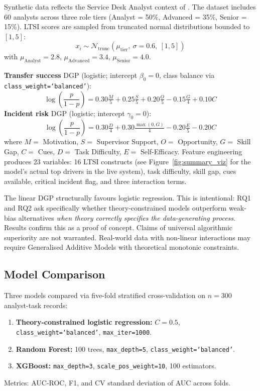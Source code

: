 \documentclass[11pt,a4paper]{article}
\begin{document}
Synthetic data reflects the Service Desk Analyst context of \citet{mughal2023}. The dataset includes 60 analysts across three role tiers (Analyst = 50\%, Advanced = 35\%, Senior = 15\%). LTSI scores are sampled from truncated normal distributions bounded to $[1,5]$:
\[
x_i \sim \mathcal{N}_{\text{trunc}}(\mu_{\text{tier}},\ \sigma = 0.6,\ [1,5])
\]
with $\mu_\text{Analyst} = 2.8$, $\mu_\text{Advanced} = 3.4$, $\mu_\text{Senior} = 4.0$.

\textbf{Transfer success} DGP (logistic; intercept $\beta_0 = 0$, class balance via \texttt{class\_weight=`balanced'}):
\[
\log\!\left(\frac{p}{1-p}\right) =
  0.30\tfrac{M}{5} + 0.25\tfrac{S}{5} + 0.20\tfrac{O}{5}
- 0.15\tfrac{G}{4} + 0.10 C
\]
\textbf{Incident risk} DGP (logistic; intercept $\gamma_0 = 0$):
\[
\log\!\left(\frac{p}{1-p}\right) =
  0.30\tfrac{D}{4} + 0.30\tfrac{\max(0,G)}{4}
- 0.20\tfrac{E}{5} - 0.20 C
\]
where $M = $ Motivation, $S = $ Supervisor Support, $O = $ Opportunity, $G = $ Skill Gap, $C = $ Cues, $D = $ Task Difficulty, $E = $ Self-Efficacy. Feature engineering produces 23 variables: 16 LTSI constructs (see Figure~\ref{fig:summary_viz} for the model's actual top drivers in the live system), task difficulty, skill gap, cues available, critical incident flag, and three interaction terms.

\begin{warningbox}
The linear DGP structurally favours logistic regression. This is intentional: RQ1 and RQ2 ask specifically whether theory-constrained models outperform weak-bias alternatives \emph{when theory correctly specifies the data-generating process}. Results confirm this as a proof of concept. Claims of universal algorithmic superiority are not warranted. Real-world data with non-linear interactions may require Generalised Additive Models with theoretical monotonic constraints.
\end{warningbox}

\subsection{Model Comparison}

Three models compared via five-fold stratified cross-validation on $n = 300$ analyst-task records:
\begin{enumerate}[leftmargin=2em]
  \item \textbf{Theory-constrained logistic regression:} $C = 0.5$, \texttt{class\_weight=`balanced'}, \texttt{max\_iter=1000}.
  \item \textbf{Random Forest:} 100 trees, \texttt{max\_depth=5}, \texttt{class\_weight=`balanced'}.
  \item \textbf{XGBoost:} \texttt{max\_depth=3}, \texttt{scale\_pos\_weight=10}, 100 estimators.
\end{enumerate}
Metrics: AUC-ROC, F1, and CV standard deviation of AUC across folds.
\end{document}
